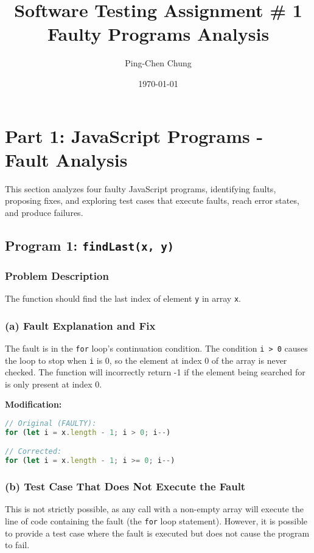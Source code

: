 \documentclass[11pt,a4paper]{article}
\title{\textbf{Software Testing Assignment \# 1}\\ Faulty Programs Analysis}
\author{Ping-Chen Chung}
\date{\today}
\begin{document}
\maketitle
\tableofcontents
\newpage

\section{Part 1: JavaScript Programs - Fault Analysis}

This section analyzes four faulty JavaScript programs, identifying faults, proposing fixes, and exploring test cases that execute faults, reach error states, and produce failures.

\subsection{Program 1: \texttt{findLast(x, y)}}

\subsubsection{Problem Description}
The function should find the last index of element \texttt{y} in array \texttt{x}.

\subsubsection{(a) Fault Explanation and Fix}

 The fault is in the \texttt{for} loop's continuation condition. The condition \texttt{i > 0} causes the loop to stop when \texttt{i} is 0, so the element at index 0 of the array is never checked. The function will incorrectly return -1 if the element being searched for is only present at index 0.

\textbf{Modification:}
\begin{lstlisting}[language=JavaScript]
// Original (FAULTY):
for (let i = x.length - 1; i > 0; i--)

// Corrected:
for (let i = x.length - 1; i >= 0; i--)
\end{lstlisting}

\subsubsection{(b) Test Case That Does Not Execute the Fault}

This is not strictly possible, as any call with a non-empty array will execute the line of code containing the fault (the \texttt{for} loop statement). However, it is possible to provide a test case where the fault is executed but does not cause the program to fail.
\end{document}
